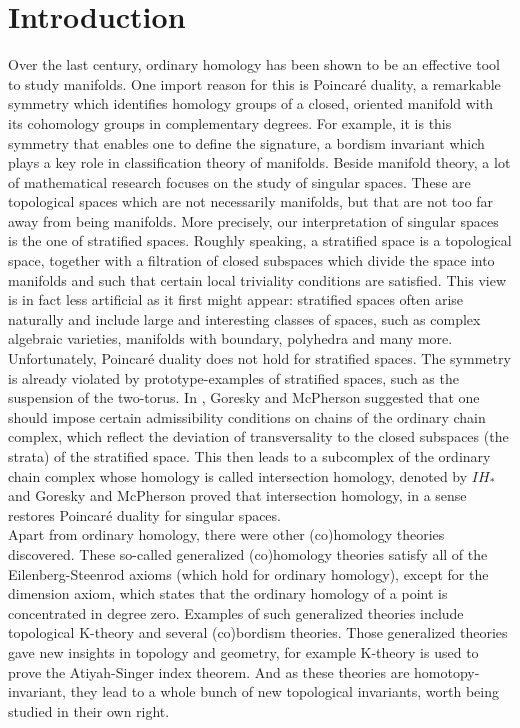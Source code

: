 \documentclass{scrreprt}
\begin{document}
\tableofcontents

\chapter{Introduction}

Over the last century, ordinary homology has been shown to be an effective tool to study manifolds. One import reason for this is Poincar\'{e} duality, a remarkable symmetry which identifies homology groups of a closed, oriented manifold with its cohomology groups in complementary degrees. For example, it is this symmetry that enables one to define the signature, a bordism invariant which plays a key role in classification theory of manifolds. Beside manifold theory, a lot of mathematical research focuses on the study of singular spaces. These are topological spaces which are not necessarily manifolds, but that are not too far away from being manifolds. More precisely, our interpretation of singular spaces is the one of stratified spaces. Roughly speaking, a stratified space is a topological space, together with a filtration of closed subspaces which divide the space into manifolds and such that certain local triviality conditions are satisfied. This view is in fact less artificial as it first might appear: stratified spaces often arise naturally and include large and interesting classes of spaces, such as complex algebraic varieties, manifolds with boundary, polyhedra and many more. \\
Unfortunately, Poincar\'{e} duality does not hold for stratified spaces. The symmetry is already violated by prototype-examples of stratified spaces, such as the suspension of the two-torus. In \cite{GM}, Goresky and McPherson suggested that one should impose certain admissibility conditions on chains of the ordinary chain complex, which reflect the deviation of transversality to the closed subspaces (the strata) of the stratified space. This then leads to a subcomplex of the ordinary chain complex whose homology is called intersection homology, denoted by $IH_*$ and Goresky and McPherson proved that intersection homology, in a sense restores Poincar\'{e} duality for singular spaces. \\
Apart from ordinary homology, there were other (co)homology theories discovered. These so-called generalized (co)homology theories satisfy all of the Eilenberg-Steenrod axioms (which hold for ordinary homology), except for the dimension axiom, which states that the ordinary homology of a point is concentrated in degree zero. Examples of such generalized theories include topological K-theory and several (co)bordism theories. Those generalized theories gave new insights in topology and geometry, for example K-theory is used to prove the Atiyah-Singer index theorem. And as these theories are homotopy-invariant, they lead to a whole bunch of new topological invariants, worth being studied in their own right. \\
\end{document}
